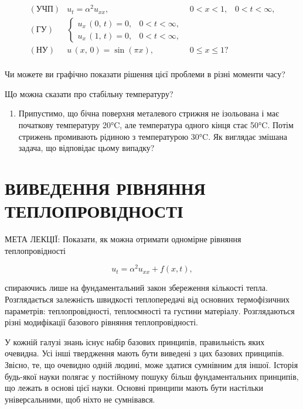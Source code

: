 \documentclass[
  ukrainian,
]{article}
\providecommand{\tightlist}{%
  \setlength{\itemsep}{0pt}\setlength{\parskip}{0pt}}
\begin{document}
\[
\begin{array}{llll} (\text{УЧП}) & u_t = \alpha^2 u_{xx}, & 0 < x < 1, & 0 < t < \infty, \\ (\text{ГУ}) & \begin{cases} u_x \, (0, \, t) = 0, & 0 < t < \infty, \\ u_x \, (1, \, t) = 0, & 0 < t < \infty, \end{cases} \\ (\text{НУ}) & u \, (x, \, 0) = \sin (\pi x), & 0 \leqslant x \leqslant 1? \\ \end{array}
\]

Чи можете ви графічно показати рішення цієї проблеми в різні моменти
часу?

Що можна сказати про стабільну температуру?

\begin{enumerate}
\def\labelenumi{\arabic{enumi}.}
\setcounter{enumi}{3}
\tightlist
\item
  Припустимо, що бічна поверхня металевого стрижня не ізольована і має
  початкову температуру 20°C, але температура одного кінця стає 50°C.
  Потім стрижень промивають рідиною з температурою 30°C. Як виглядає
  змішана задача, що відповідає цьому випадку?
\end{enumerate}

\section{ВИВЕДЕННЯ РІВНЯННЯ
ТЕПЛОПРОВІДНОСТІ}\label{ux432ux438ux432ux435ux434ux435ux43dux43dux44f-ux440ux456ux432ux43dux44fux43dux43dux44f-ux442ux435ux43fux43bux43eux43fux440ux43eux432ux456ux434ux43dux43eux441ux442ux456}

МЕТА ЛЕКЦІЇ: Показати, як можна отримати одномірне рівняння
теплопровідності

\[
u_t = \alpha^2 u_{xx} + f(x, t),
\]

спираючись лише на фундаментальний закон збереження кількості тепла.
Розглядається залежність швидкості теплопередачі від основних
термофізичних параметрів: теплопровідності, теплоємності та густини
матеріалу. Розглядаються різні модифікації базового рівняння
теплопровідності.

У кожній галузі знань існує набір базових принципів, правильність яких
очевидна. Усі інші твердження мають бути виведені з цих базових
принципів. Звісно, те, що очевидно одній людині, може здатися сумнівним
для іншої. Історія будь-якої науки полягає у постійному пошуку більш
фундаментальних принципів, що лежать в основі цієї науки. Основні
принципи мають бути настільки універсальними, щоб ніхто не сумнівався.
\end{document}
